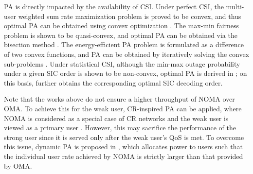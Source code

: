 \documentclass[10pt,final,journal,a4paper,twoside,twocolumn,romanappendices]{IEEEtran}
\theoremstyle{myremark}
\theoremstyle{myremark}
\begin{document}

{\color{black}PA is directly impacted by the availability of CSI. Under perfect CSI, the multi-user weighted sum rate maximization problem is proved to be convex, and thus optimal PA can be obtained using convex optimization \cite{31}. The max-min fairness problem is shown to be quasi-convex, and optimal PA can be obtained via the bisection method \cite{13}. The energy-efficient PA problem is formulated as a difference of two convex functions, and PA can be obtained by iteratively solving the convex sub-problems \cite{32}. Under statistical CSI, although the min-max outage probability under a given SIC order is shown to be non-convex, optimal PA is derived in \cite{13}; on this basis, \cite{29} further obtains the corresponding optimal SIC decoding order.
}


Note that the works above do not ensure a higher throughput of NOMA over OMA. To achieve this for the weak user, CR-inspired PA can be applied, where NOMA is considered as a special case of CR networks and the weak user is viewed as a primary user \cite{19}. However, this may sacrifice the performance of the strong user since it is served only after the weak user's QoS is met.
To overcome this issue, dynamic PA is proposed in \cite{17}, which allocates power to users such
that the individual user rate achieved by NOMA is strictly larger than that provided by OMA.
\end{document}
